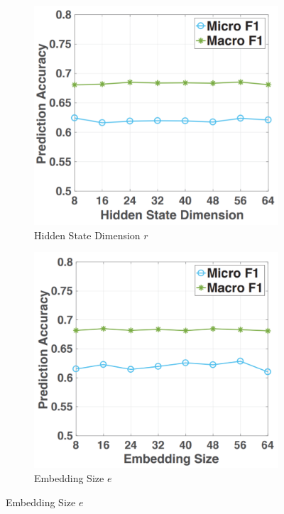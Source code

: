 \begin{figure}[!h]
    \captionsetup[subfigure]{font=small,labelfont=small}
    \centering
    \vspace{3cm}
    \begin{subfigure}{0.45\textwidth}
        \centering
        \includegraphics[width=0.9\linewidth]{Chapter5/Images/macro/a.png} 
        \caption{Hidden State Dimension $r$}
        \label{fig:mac1}
    \end{subfigure}
    \begin{subfigure}{0.45\textwidth}
        \centering
        \includegraphics[width=0.9\linewidth]{Chapter5/Images/macro/b.png}
        \caption{Embedding Size $e$}
        \label{fig:mac2}
    \end{subfigure}


\end{figure}
